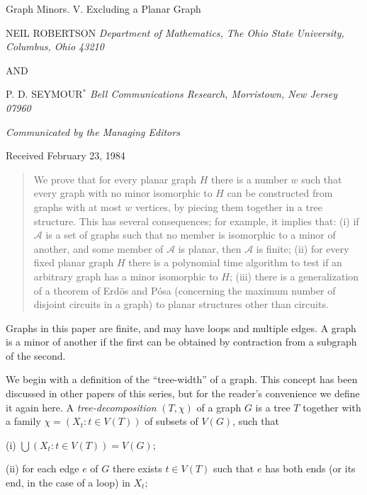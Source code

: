 {\centering
{\Large Graph Minors. V. Excluding a Planar Graph\par}\medskip

NEIL ROBERTSON \textit{Department of Mathematics, The Ohio State University, Columbus, Ohio 43210}\par
AND\par
P. D. SEYMOUR$^*$ \textit{Bell Communications Research, Morristown, New Jersey 07960}\par
\textit{Communicated by the Managing Editors}\par
Received February 23, 1984\par
}
\begin{quote}
We prove that for every planar graph $H$ there is a number $w$ such that every graph with no minor isomorphic to $H$ can be constructed from graphs with at most $w$ vertices, by piecing them together in a tree structure. This has several consequences; for example, it implies that: (i) if $\mathscr{A}$ is a set of graphs such that no member is isomorphic to a minor of another, and some member of $\mathscr{A}$ is planar, then $\mathscr{A}$ is finite; (ii) for every fixed planar graph $H$ there is a polynomial time algorithm to test if an arbitrary graph has a minor isomorphic to $H$; (iii) there is a generalization of a theorem of Erd\"os and P\'osa (concerning the maximum number of disjoint circuits in a graph) to planar structures other than circuits.

\end{quote}


Graphs in this paper are finite, and may have loops and multiple edges. A graph is a minor of another if the first can be obtained by contraction from a subgraph of the second.

We begin with a definition of the ``tree-width'' of a graph. This concept has been discussed in other papers of this series, but for the reader's convenience we define it again here. A \textit{tree-decomposition} $(T, \chi)$ of a graph $G$ is a tree $T$ together with a family $\chi = (X_t : t \in V(T))$ of subsets of $V(G)$, such that

\hspace*{12pt}(i) $\bigcup(X_t : t \in V(T)) = V(G)$;

\hspace*{12pt}(ii) for each edge $e$ of $G$ there exists $t \in V(T)$ such that $e$ has both ends (or its end, in the case of a loop) in $X_t$;%
